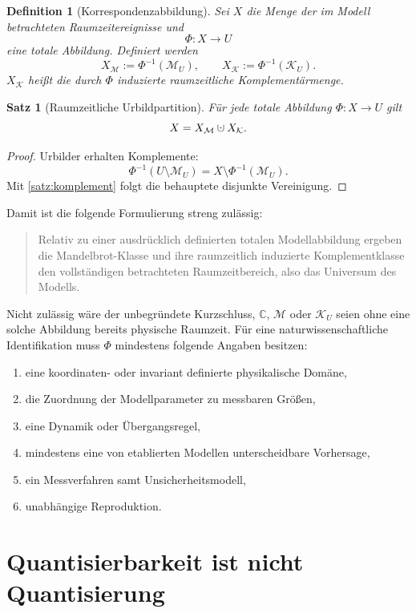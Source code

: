 \documentclass[11pt,a4paper]{article}
\newtheorem{definition}{Definition}[section]
\newtheorem{satz}{Satz}[section]
\theoremstyle{remark}
\newcommand{\M}{\mathcal{M}}
\newcommand{\K}{\mathcal{K}}
\newcommand{\C}{\mathbb{C}}
\newcommand{\dotcup}{\mathbin{\mathaccent\cdot\cup}}
\begin{document}
\begin{definition}[Korrespondenzabbildung]
Sei \(X\) die Menge der im Modell betrachteten Raumzeitereignisse und
\[
  \Phi:X\longrightarrow U
\]
eine totale Abbildung. Definiert werden
\[
  X_{\M}:=\Phi^{-1}(\M_U),
  \qquad
  X_{\K}:=\Phi^{-1}(\K_U).
\]
\(X_{\K}\) heißt die durch \(\Phi\) induzierte raumzeitliche
Komplementärmenge.
\end{definition}

\begin{satz}[Raumzeitliche Urbildpartition]
\label{satz:urbild}
Für jede totale Abbildung \(\Phi:X\to U\) gilt
\[
  X=X_{\M}\dotcup X_{\K}.
\]
\end{satz}

\begin{proof}
Urbilder erhalten Komplemente:
\[
  \Phi^{-1}(U\setminus\M_U)
  =X\setminus\Phi^{-1}(\M_U).
\]
Mit \cref{satz:komplement} folgt die behauptete disjunkte Vereinigung.
\end{proof}

Damit ist die folgende Formulierung streng zulässig:

\begin{quote}
Relativ zu einer ausdrücklich definierten totalen Modellabbildung ergeben die
Mandelbrot-Klasse und ihre raumzeitlich induzierte Komplementklasse den
vollständigen betrachteten Raumzeitbereich, also das Universum des Modells.
\end{quote}

Nicht zulässig wäre der unbegründete Kurzschluss, \(\C\), \(\M\) oder
\(\K_U\) seien ohne eine solche Abbildung bereits physische Raumzeit. Für eine
naturwissenschaftliche Identifikation muss \(\Phi\) mindestens folgende
Angaben besitzen:

\begin{enumerate}
  \item eine koordinaten- oder invariant definierte physikalische Domäne,
  \item die Zuordnung der Modellparameter zu messbaren Größen,
  \item eine Dynamik oder Übergangsregel,
  \item mindestens eine von etablierten Modellen unterscheidbare Vorhersage,
  \item ein Messverfahren samt Unsicherheitsmodell,
  \item unabhängige Reproduktion.
\end{enumerate}

\section{Quantisierbarkeit ist nicht Quantisierung}
\label{sec:quantisierbarkeit}
\end{document}
